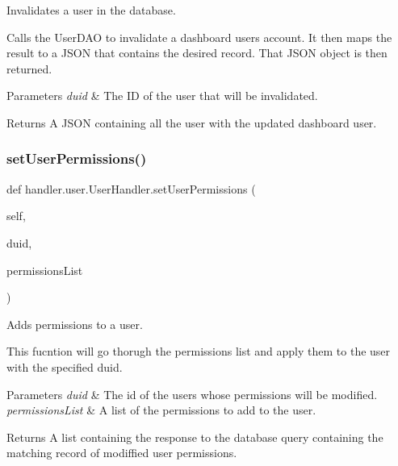 Invalidates a user in the database. 

Calls the User\+D\+AO to invalidate a dashboard user\textquotesingle{}s account. It then maps the result to a J\+S\+ON that contains the desired record. That J\+S\+ON object is then returned.


\begin{DoxyParams}{Parameters}
{\em duid} & The ID of the user that will be invalidated.\\
\hline
\end{DoxyParams}
\begin{DoxyReturn}{Returns}
A J\+S\+ON containing all the user with the updated dashboard user. 
\end{DoxyReturn}
\mbox{\label{classhandler_1_1user_1_1_user_handler_a0c8766b4b476bc123a2306aeccd2b52c}} 
\subsubsection{\texorpdfstring{set\+User\+Permissions()}{setUserPermissions()}}
{\footnotesize\ttfamily def handler.\+user.\+User\+Handler.\+set\+User\+Permissions (\begin{DoxyParamCaption}\item[{}]{self,  }\item[{}]{duid,  }\item[{}]{permissions\+List }\end{DoxyParamCaption})}



Adds permissions to a user. 

This fucntion will go thorugh the permissions list and apply them to the user with the specified duid.


\begin{DoxyParams}{Parameters}
{\em duid} & The id of the user\textquotesingle{}s whose permissions will be modified. \\
\hline
{\em permissions\+List} & A list of the permissions to add to the user.\\
\hline
\end{DoxyParams}
\begin{DoxyReturn}{Returns}
A list containing the response to the database query containing the matching record of modiffied user permissions. 
\end{DoxyReturn}
\mbox{\label{classhandler_1_1user_1_1_user_handler_aa98936c6961b8de393b8fd3f76882170}} 
